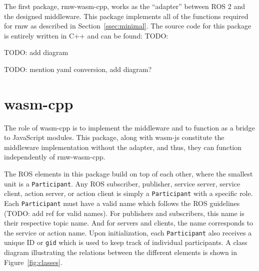         The first package, \textsf{rmw-wasm-cpp}, works as the ``adapter'' between \ac{ROS} 2 and the designed middleware. This package implements all of the functions required for \textsf{rmw} as described in Section~\ref{ssec:minimal}. The source code for this package is entirely written in C++ and can be found: TODO: 

        TODO: add diagram

        TODO: mention yaml conversion, add diagram?

    \section{wasm-cpp}

        The role of \textsf{wasm-cpp} is to implement the middleware and to function as a bridge to JavaScript modules. This package, along with \textsf{wasm-js} constitute the middleware implementation without the adapter, and thus, they can function independently of \textsf{rmw-wasm-cpp}. 

        The \ac{ROS} elements in this package build on top of each other, where the smallest unit is a \texttt{Participant}. Any \ac{ROS} subscriber, publisher, service server, service client, action server, or action client is simply a \texttt{Participant} with a specific role. Each \texttt{Participant} must have a valid name which follows the \ac{ROS} guidelines (TODO: add ref for valid names). For publishers and subscribers, this name is their respective topic name. And for servers and clients, the name corresponds to the service or action name.  Upon initialization, each \texttt{Participant} also receives a unique ID or \texttt{gid} which is used to keep track of individual participants. A class diagram illustrating the relations between the different elements is shown in Figure~\ref{fig:classes}.

